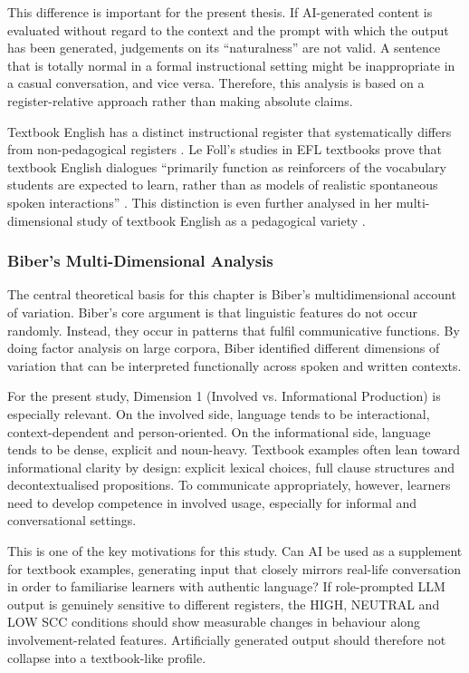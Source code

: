 \documentclass[11pt,a4paper]{article}
\begin{document}
This difference is important for the present thesis. If AI-generated content is evaluated without regard to the context and the prompt with which the output has been generated, judgements on its ``naturalness'' are not valid. A sentence that is totally normal in a formal instructional setting might be inappropriate in a casual conversation, and vice versa. Therefore, this analysis is based on a register-relative approach rather than making absolute claims. 

Textbook English has a distinct instructional register that systematically differs from non-pedagogical registers \parencite{leFoll2021b}. Le Foll's studies in EFL textbooks prove that textbook English dialogues ``primarily function as reinforcers of the vocabulary students are expected to learn, rather than as models of realistic spontaneous spoken interactions'' \parencite[108]{leFoll2021b}. This distinction is even further analysed in her multi-dimensional study of textbook English as a pedagogical variety \parencite[379--467]{leFoll2024}.

\subsubsection{Biber's Multi-Dimensional Analysis}\label{subsubsec:biber-mda}

The central theoretical basis for this chapter is Biber's \parencite*{biber1988variation} multidimensional account of variation. Biber's core argument is that linguistic features do not occur randomly. Instead, they occur in patterns that fulfil communicative functions. By doing factor analysis on large corpora, Biber identified different dimensions of variation that can be interpreted functionally across spoken and written contexts.

For the present study, Dimension 1 (Involved vs. Informational Production) is especially relevant. On the involved side, language tends to be interactional, context-dependent and person-oriented. On the informational side, language tends to be dense, explicit and noun-heavy. Textbook examples often lean toward informational clarity by design: explicit lexical choices, full clause structures and decontextualised propositions. To communicate appropriately, however, learners need to develop competence in involved usage, especially for informal and conversational settings. 

This is one of the key motivations for this study. Can AI be used as a supplement for textbook examples, generating input that closely mirrors real-life conversation in order to familiarise learners with authentic language? If role-prompted LLM output is genuinely sensitive to different registers, the HIGH, NEUTRAL and LOW SCC conditions should show measurable changes in behaviour along involvement-related features. Artificially generated output should therefore not collapse into a textbook-like profile.
\end{document}

